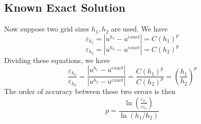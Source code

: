 \documentclass[11pt]{article}
\begin{document}
\subsection{Known Exact Solution}
Now suppose two grid sizes $h_1,h_2$ are used. We have
\begin{equation}
	\varepsilon_{h_1} = |u^{h_1} - u^{exact}| = C (h_1)^p
\end{equation}
\begin{equation}
	\varepsilon_{h_2} = |u^{h_2} - u^{exact}| = C (h_2)^p
\end{equation}
Dividing these equations, we have
\begin{equation}
	\frac{\varepsilon_{h_1}}{\varepsilon_{h_2}}
	=
	\frac{|u^{h_1} - u^{exact}|}{|u^{h_2} - u^{exact}|}
	=
	\frac{C (h_1)^p}{C (h_2)^p}
	= 
	\left(\frac{h_1}{h_2}\right)^p
\end{equation}
The order of accuracy between these two errors is then
\begin{equation}
	\boxed{
	p = \frac{\ln(\frac{\varepsilon_{h_1}}{\varepsilon_{h_2}})}{\ln(h_1/h_2)}
	}
\end{equation}
\end{document}
